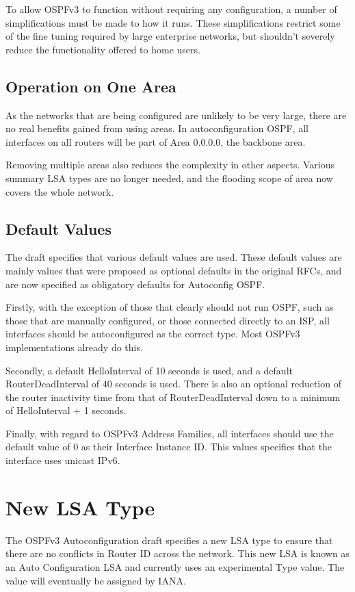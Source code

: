 \documentclass[12pt]{report}
\begin{document}
To allow OSPFv3 to function without requiring any configuration, a number of
simplifications must be made to how it runs. These simplifications restrict
some of the fine tuning required by large enterprise networks, but shouldn't
severely reduce the functionality offered to home users. 

\subsection{Operation on One Area}
As the networks that are being configured are unlikely to be very large, there
are no real benefits gained from using areas. In autoconfiguration OSPF, all
interfaces on all routers will be part of Area 0.0.0.0, the backbone area.

Removing multiple areas also reduces the complexity in other aspects. Various
summary LSA types are no longer needed, and the flooding scope of area now
covers the whole network.

\subsection{Default Values}
The draft specifies that various default values are used. These default values
are mainly values that were proposed as optional defaults in the original RFCs,
and are now specified as obligatory defaults for Autoconfig OSPF\@. 

Firstly, with the exception of those that clearly should not run OSPF, such as
those that are manually configured, or those connected directly to an ISP, all
interfaces should be autoconfigured as the correct type. Most OSPFv3
implementations already do this. 

Secondly, a default HelloInterval of 10 seconds is used, and a default
RouterDeadInterval of 40 seconds is used. There is also an optional reduction
of the router inactivity time from that of RouterDeadInterval down to a minimum
of HelloInterval + 1 seconds. 

Finally, with regard to OSPFv3 Address Families, all interfaces should use the
default value of 0 as their Interface Instance ID\@. This values specifies that
the interface uses unicast IPv6.  

\section{New LSA Type}
The OSPFv3 Autoconfiguration draft specifies a new LSA type to ensure that
there are no conflicts in Router ID across the network. This new LSA is known
as an Auto Configuration LSA and currently uses an experimental Type value. The
value will eventually be assigned by IANA\@. 
\end{document}

